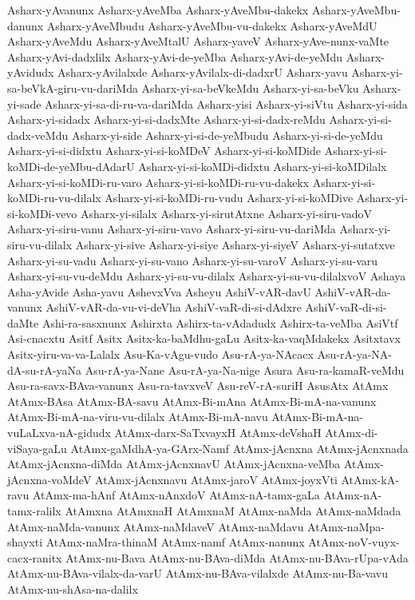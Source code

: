 {Asharx-yAvanunx
Asharx-yAveMba
Asharx-yAveMbu-dakekx
Asharx-yAveMbu-danunx
Asharx-yAveMbudu
Asharx-yAveMbu-vu-dakekx
Asharx-yAveMdU
Asharx-yAveMdu
Asharx-yAveMtalU
Asharx-yaveV
Asharx-yAve-nunx-vaMte
Asharx-yAvi-dadxlilx
Asharx-yAvi-de-yeMba
Asharx-yAvi-de-yeMdu
Asharx-yAvidudx
Asharx-yAvilalxde
Asharx-yAvilalx-di-dadxrU
Asharx-yavu
Asharx-yi-sa-beVkA-giru-vu-dariMda
Asharx-yi-sa-beVkeMdu
Asharx-yi-sa-beVku
Asharx-yi-sade
Asharx-yi-sa-di-ru-va-dariMda
Asharx-yisi
Asharx-yi-siVtu
Asharx-yi-sida
Asharx-yi-sidadx
Asharx-yi-si-dadxMte
Asharx-yi-si-dadx-reMdu
Asharx-yi-si-dadx-veMdu
Asharx-yi-side
Asharx-yi-si-de-yeMbudu
Asharx-yi-si-de-yeMdu
Asharx-yi-si-didxtu
Asharx-yi-si-koMDeV
Asharx-yi-si-koMDide
Asharx-yi-si-koMDi-de-yeMbu-dAdarU
Asharx-yi-si-koMDi-didxtu
Asharx-yi-si-koMDilalx
Asharx-yi-si-koMDi-ru-varo
Asharx-yi-si-koMDi-ru-vu-dakekx
Asharx-yi-si-koMDi-ru-vu-dilalx
Asharx-yi-si-koMDi-ru-vudu
Asharx-yi-si-koMDive
Asharx-yi-si-koMDi-vevo
Asharx-yi-silalx
Asharx-yi-sirutAtxne
Asharx-yi-siru-vadoV
Asharx-yi-siru-vanu
Asharx-yi-siru-vavo
Asharx-yi-siru-vu-dariMda
Asharx-yi-siru-vu-dilalx
Asharx-yi-sive
Asharx-yi-siye
Asharx-yi-siyeV
Asharx-yi-sutatxve
Asharx-yi-su-vadu
Asharx-yi-su-vano
Asharx-yi-su-varoV
Asharx-yi-su-varu
Asharx-yi-su-vu-deMdu
Asharx-yi-su-vu-dilalx
Asharx-yi-su-vu-dilalxvoV
Ashaya
Asha-yAvide
Asha-yavu
AshevxVva
Asheyu
AshiV-vAR-davU
AshiV-vAR-da-vanunx
AshiV-vAR-da-vu-vi-deVha
AshiV-vaR-di-si-dAdxre
AshiV-vaR-di-si-daMte
Ashi-ra-sasxnunx
Ashirxta
Ashirx-ta-vAdadudx
Ashirx-ta-veMba
AsiVtf
Asi-cnacxtu
Asitf
Asitx
Asitx-ka-baMdhu-gaLu
Asitx-ka-vaqMdakekx
Asitxtavx
Asitx-yiru-va-va-Lalalx
Asu-Ka-vAgu-vudo
Asu-rA-ya-NAcacx
Asu-rA-ya-NA-dA-su-rA-yaNa
Asu-rA-ya-Nane
Asu-rA-ya-Na-nige
Asura
Asu-ra-kamaR-veMdu
Asu-ra-savx-BAva-vanunx
Asu-ra-tavxveV
Asu-reV-rA-suriH
AsusAtx
AtAmx
AtAmx-BAsa
AtAmx-BA-savu
AtAmx-Bi-mAna
AtAmx-Bi-mA-na-vanunx
AtAmx-Bi-mA-na-viru-vu-dilalx
AtAmx-Bi-mA-navu
AtAmx-Bi-mA-na-vuLaLxva-nA-gidudx
AtAmx-darx-SaTxvayxH
AtAmx-deVshaH
AtAmx-di-viSaya-gaLu
AtAmx-gaMdhA-ya-GArx-Namf
AtAmx-jAcnxna
AtAmx-jAcnxnada
AtAmx-jAcnxna-diMda
AtAmx-jAcnxnavU
AtAmx-jAcnxna-veMba
AtAmx-jAcnxna-voMdeV
AtAmx-jAcnxnavu
AtAmx-jaroV
AtAmx-joyxVti
AtAmx-kA-ravu
AtAmx-ma-hAnf
AtAmx-nAnxdoV
AtAmx-nA-tamx-gaLa
AtAmx-nA-tamx-ralilx
AtAmxna
AtAmxnaH
AtAmxnaM
AtAmx-naMda
AtAmx-naMdada
AtAmx-naMda-vanunx
AtAmx-naMdaveV
AtAmx-naMdavu
AtAmx-naMpa-shayxti
AtAmx-naMra-thinaM
AtAmx-namf
AtAmx-nanunx
AtAmx-noV-vuyx-cacx-ranitx
AtAmx-nu-Bava
AtAmx-nu-BAva-diMda
AtAmx-nu-BAva-rUpa-vAda
AtAmx-nu-BAva-vilalx-da-varU
AtAmx-nu-BAva-vilalxde
AtAmx-nu-Ba-vavu
AtAmx-nu-shAsa-na-dalilx
}
